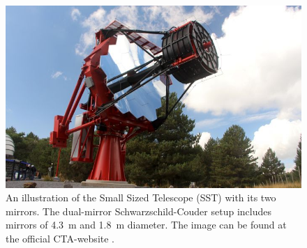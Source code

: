\begin{figure}
	\center
	\includegraphics[width=.5\textwidth]{images/sst.jpg}
	\caption{An illustration of the Small Sized Telescope (SST) with its
	two mirrors.
	The dual-mirror Schwarzschild-Couder setup includes mirrors of
	\SI{4.3}{\meter} and \SI{1.8}{\meter} diameter.
	The image can be found at the official CTA-website \cite{cta_web}.}
	\label{fig:sst}
\end{figure}
